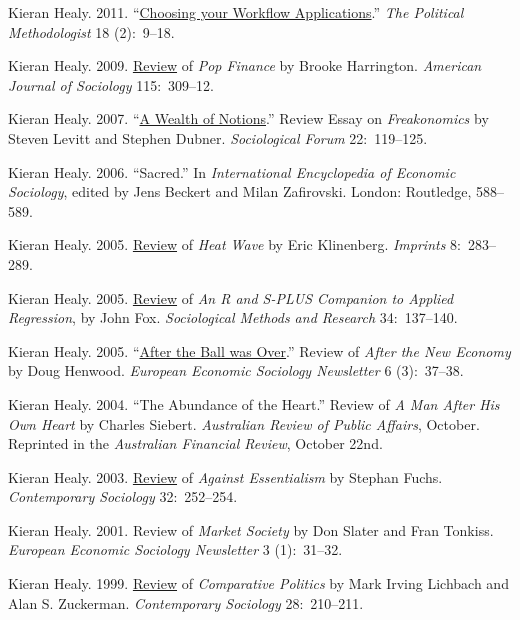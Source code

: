 \documentclass[11pt,oneside,a4paper,DIV=8]{scrartcl}
\begin{document}
Kieran Healy. 2011. ``\href{http://polmeth.wustl.edu/methodologist/tpm_v18_n2.pdf}{Choosing your Workflow Applications}.'' \emph{The Political Methodologist} 18 (2):~9--18. 

Kieran Healy. 2009. \href{http://www.journals.uchicago.edu/doi/pdf/10.1086/605757}{Review} of \emph{Pop Finance} by Brooke Harrington. \emph{American Journal of Sociology} 115:~309--12.

Kieran Healy. 2007. ``\href{http://www.kieranhealy.org/files/reviews/socforum-article.pdf}{A Wealth of Notions}.'' Review
Essay on \emph{Freakonomics} by Steven Levitt and Stephen Dubner. \emph{Sociological Forum} 22:~119--125. 

Kieran Healy. 2006. ``Sacred.'' In \emph{International Encyclopedia of Economic Sociology}, edited by Jens Beckert and Milan Zafirovski. London: Routledge, 588--589. 

Kieran Healy. 2005. \href{http://www.kieranhealy.org/files/reviews/klinenberg.pdf}{Review} of \emph{Heat Wave} by Eric Klinenberg. \emph{Imprints} 8:~283--289.

Kieran Healy. 2005. \href{http://www.kieranhealy.org/files/reviews/fox.pdf}{Review} of \emph{An R and S-PLUS Companion to Applied Regression}, by John Fox. \emph{Sociological Methods and Research} 34:~137--140.

Kieran Healy. 2005. ``\href{http://www.kieranhealy.org/files/reviews/henwood.pdf}{After the Ball was Over}.'' Review of \emph{After the New
  Economy} by Doug Henwood. \emph{European Economic Sociology Newsletter} 6 (3):~37--38.

Kieran Healy. 2004. ``The Abundance of the Heart.'' Review of \emph{A Man After His Own Heart} by Charles
Siebert. \emph{Australian Review of Public Affairs}, October. Reprinted in the
\emph{Australian Financial Review}, October 22nd.

Kieran Healy. 2003. \href{http://links.jstor.org/sici?sici=0094-3061%28200303%2932%3A2%3C252%3AAEATOC%3E2.0.CO%3B2-F}{Review} of \emph{Against Essentialism} by Stephan Fuchs.
\emph{Contemporary Sociology} 32:~252--254.

Kieran Healy. 2001. Review of \emph{Market Society} by Don Slater and Fran Tonkiss. \emph{European Economic Sociology Newsletter} 3 (1):~31--32.


Kieran Healy. 1999. \href{http://links.jstor.org/sici?sici=0094-3061%28199903%2928%3A2%3C210%3ACPRCAS%3E2.0.CO%3B2-C}{Review} of \emph{Comparative Politics} by Mark Irving Lichbach and Alan S.
Zuckerman. \emph{Contemporary Sociology} 28:~210--211.
\end{document}
